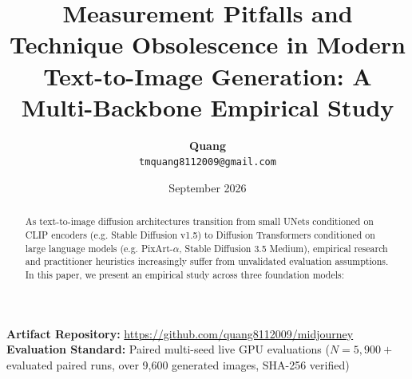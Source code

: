 \documentclass[10pt,twocolumn,letterpaper]{article}
\title{\textbf{Measurement Pitfalls and Technique Obsolescence in Modern Text-to-Image Generation: A Multi-Backbone Empirical Study}}
\author{
  \textbf{Quang} \\
  \texttt{tmquang8112009@gmail.com}
}
\date{September 2026}
\begin{document}
\maketitle

\noindent\textbf{Artifact Repository:} \url{https://github.com/quang8112009/midjourney} \\
\textbf{Evaluation Standard:} Paired multi-seed live GPU evaluations ($N = 5{,}900+$ evaluated paired runs, over 9,600 generated images, SHA-256 verified)

\vspace{1em}

\begin{abstract}
As text-to-image diffusion architectures transition from small UNets conditioned on CLIP encoders (e.g. Stable Diffusion v1.5) to Diffusion Transformers conditioned on large language models (e.g. PixArt-$\alpha$, Stable Diffusion 3.5 Medium), empirical research and practitioner heuristics increasingly suffer from unvalidated evaluation assumptions. In this paper, we present an empirical study across three foundation models:


\end{abstract}
\end{document}
